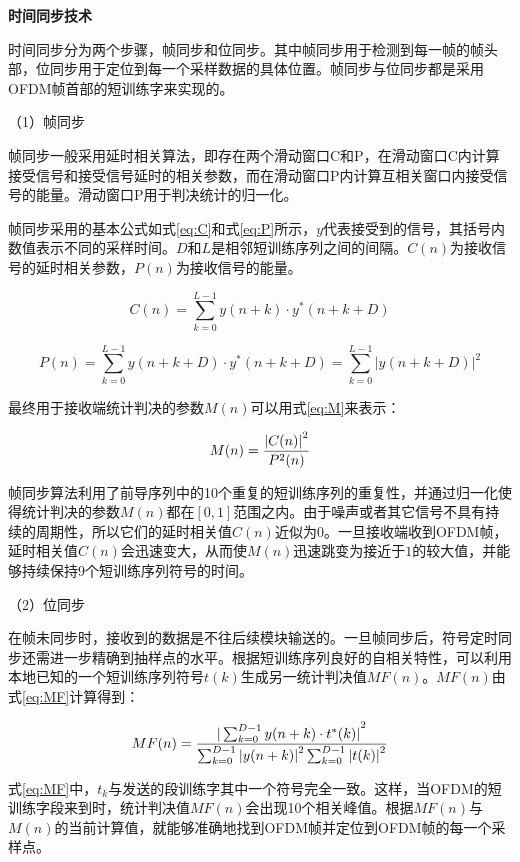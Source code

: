 \documentclass[titlepage]{article}
\numberwithin{figure}{section}
\numberwithin{equation}{section}
\begin{document}
\textbf{时间同步技术}

时间同步分为两个步骤，帧同步和位同步。其中帧同步用于检测到每一帧的帧头部，位同步用于定位到每一个采样数据的具体位置。帧同步与位同步都是采用OFDM帧首部的短训练字来实现的。

（1）帧同步

帧同步一般采用延时相关算法，即存在两个滑动窗口C和P，在滑动窗口C内计算接受信号和接受信号延时的相关参数，而在滑动窗口P内计算互相关窗口内接受信号的能量。滑动窗口P用于判决统计的归一化。

帧同步采用的基本公式如式\ref{eq:C}和式\ref{eq:P}所示，$y$代表接受到的信号，其括号内数值表示不同的采样时间。$D$和$L$是相邻短训练序列之间的间隔。$C(n)$为接收信号的延时相关参数，$P(n)$为接收信号的能量。

\begin{equation}\label{eq:C}
C(n)=\sum_{k=0}^{L-1}y(n+k)\cdot y^{*}(n+k+D)
\end{equation}

\begin{equation}\label{eq:P}
P(n)=\sum_{k=0}^{L-1}y(n+k+D)\cdot y^{*}(n+k+D)=\sum_{k=0}^{L-1}{|y(n+k+D)|}^2
\end{equation}

最终用于接收端统计判决的参数$M(n)$可以用式\ref{eq:M}来表示：

\begin{equation}\label{eq:M}
M(n)={{|C(n)|}^{2}\over P^{2}(n)}
\end{equation}

帧同步算法利用了前导序列中的10个重复的短训练序列的重复性，并通过归一化使得统计判决的参数$M(n)$都在$[0,1]$范围之内。由于噪声或者其它信号不具有持续的周期性，所以它们的延时相关值$C(n)$近似为$0$。一旦接收端收到OFDM帧，延时相关值$C(n)$会迅速变大，从而使$M(n)$迅速跳变为接近于$1$的较大值，并能够持续保持9个短训练序列符号的时间。

（2）位同步

在帧未同步时，接收到的数据是不往后续模块输送的。一旦帧同步后，符号定时同步还需进一步精确到抽样点的水平。根据短训练序列良好的自相关特性，可以利用本地已知的一个短训练序列符号$t(k)$生成另一统计判决值$MF(n)$。$MF(n)$由式\ref{eq:MF}计算得到：

\begin{equation}\label{eq:MF}
MF(n)={{|\sum_{k=0}^{D-1}y(n+k)\cdot t^{*}(k)|}^{2} \over \sum_{k=0}^{D-1}{|y(n+k)|}^{2} \sum_{k=0}^{D-1}{|t(k)|}^{2}}
\end{equation}

式\ref{eq:MF}中，$t_{k}$与发送的段训练字其中一个符号完全一致。这样，当OFDM的短训练字段来到时，统计判决值$MF(n)$会出现10个相关峰值。根据$MF(n)$与$M(n)$的当前计算值，就能够准确地找到OFDM帧并定位到OFDM帧的每一个采样点。
\end{document}

